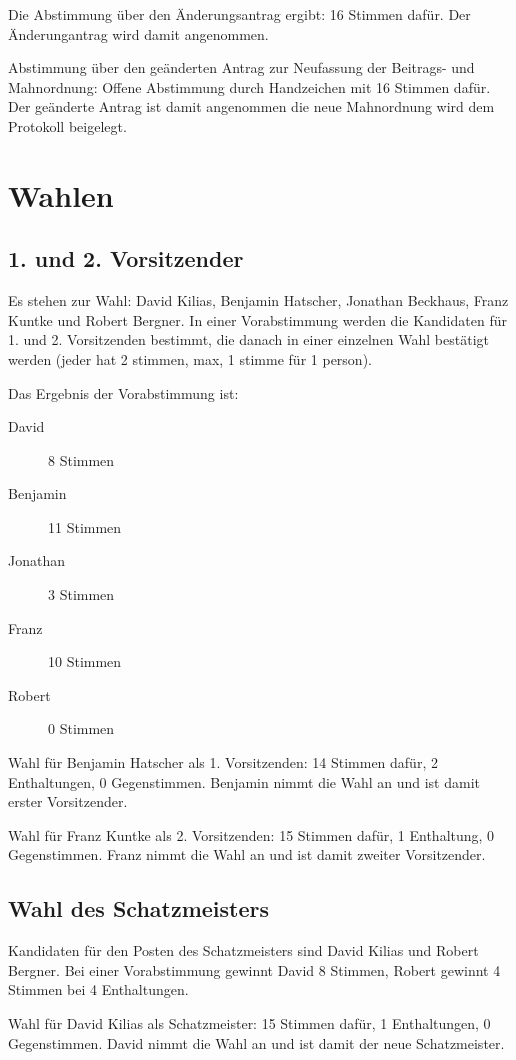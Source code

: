 \documentclass[a4paper,12pt,titlepage]{scrartcl}
\begin{document}
Die Abstimmung über den Änderungsantrag ergibt: 16 Stimmen dafür. Der Änderungantrag wird damit angenommen.


Abstimmung über den geänderten Antrag zur Neufassung der Beitrags- und Mahnordnung: Offene Abstimmung durch Handzeichen mit 16 Stimmen dafür. Der geänderte Antrag ist damit angenommen die neue Mahnordnung wird dem Protokoll beigelegt.


\section{Wahlen}

\subsection{ 1. und 2. Vorsitzender }
Es stehen zur Wahl: David Kilias, Benjamin Hatscher, Jonathan Beckhaus, Franz Kuntke und Robert Bergner. In einer Vorabstimmung werden die Kandidaten für 1. und 2. Vorsitzenden bestimmt, die danach in einer einzelnen Wahl bestätigt werden (jeder hat 2 stimmen, max, 1 stimme für 1 person).

Das Ergebnis der Vorabstimmung ist: 
\begin{description}
	\item[David] 8 Stimmen
	\item[Benjamin] 11 Stimmen
	\item[Jonathan] 3 Stimmen
	\item[Franz] 10 Stimmen
	\item[Robert] 0 Stimmen
\end{description}
    
Wahl für Benjamin Hatscher als 1. Vorsitzenden: 14 Stimmen dafür, 2 Enthaltungen, 0 Gegenstimmen. Benjamin nimmt die Wahl an und ist damit erster Vorsitzender.
    
Wahl für Franz Kuntke als 2. Vorsitzenden: 15 Stimmen dafür, 1 Enthaltung, 0 Gegenstimmen. Franz nimmt die Wahl an und ist damit zweiter Vorsitzender.


\subsection{ Wahl des Schatzmeisters }
Kandidaten für den Posten des Schatzmeisters sind David Kilias und Robert Bergner. Bei einer Vorabstimmung gewinnt David 8 Stimmen, Robert gewinnt 4 Stimmen bei 4 Enthaltungen.

Wahl für David Kilias als Schatzmeister: 15 Stimmen dafür, 1 Enthaltungen, 0 Gegenstimmen. David nimmt die Wahl an und ist damit der neue Schatzmeister.
\end{document}
